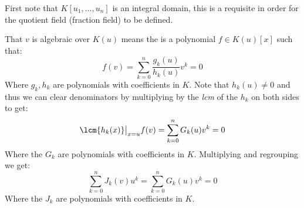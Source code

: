 First note that $K[u_1,\ldots ,u_n]$ is an integral domain, this is a requisite in order for the quotient field (fraction field) to be defined. 


That $v$ is algebraic over $K(u)$ means the is a polynomial $f\in K(u)[x]$ such that:
$$f(v) = \sum_{k=0}^n \frac{g_k(u)}{h_k(u)} v^k=0$$
Where $g_k,h_k$ are polynomials with coefficients in $K$. 
Note that $h_k(u)\neq 0$ and thus we can clear denominators by multiplying by the \emph{lcm} of the $h_k$ on both sides to get:
$$\lcm\{h_k(x)\}\big|_{x=u}f(v) = \sum_{k=0}^n G_k(u) v^k =0$$
Where the $G_k$ are polynomials with coefficients in $K$. Multiplying and regrouping we get:
$$\sum_{k=0}^n J_k(v) u^k = \sum_{k=0}^n G_k(u) v^k =0$$
Where the $J_k$ are polynomials with coefficients in $K$.
